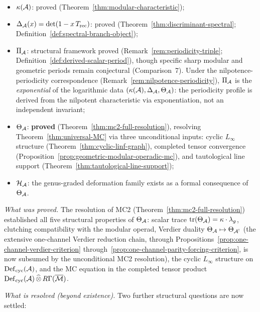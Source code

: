 \begin{itemize}[nosep]
\item $\kappa(\mathcal{A})$: proved (Theorem~\ref{thm:modular-characteristic});
\item $\Delta_{\mathcal{A}}(x) = \det(1 - x\,T_{\mathrm{rec}})$: proved
  (Theorem~\ref{thm:discriminant-spectral};
  Definition~\ref{def:spectral-branch-object});
\item $\Pi_{\mathcal{A}}$: structural framework proved
  (Remark~\ref{rem:periodicity-triple};
  Definition~\ref{def:derived-scalar-period}), though
  specific sharp modular and geometric periods remain conjectural
  (Comparison~7).  Under the nilpotence-periodicity correspondence
  (Remark~\ref{rem:nilpotence-periodicity}), $\Pi_{\mathcal{A}}$ is the
  \emph{exponential} of the logarithmic data
  $(\kappa(\mathcal{A}), \Delta_{\mathcal{A}}, \Theta_{\mathcal{A}})$: the periodicity
  profile is derived from the nilpotent characteristic via
  exponentiation, not an independent invariant;
\item $\Theta_{\mathcal{A}}$: \textbf{proved}
  (Theorem~\ref{thm:mc2-full-resolution}), resolving
  Theorem~\ref{thm:universal-MC} via three unconditional inputs:
  cyclic $L_\infty$ structure
  (Theorem~\ref{thm:cyclic-linf-graph}),
  completed tensor convergence
  (Proposition~\ref{prop:geometric-modular-operadic-mc}),
  and tautological line support
  (Theorem~\ref{thm:tautological-line-support});
\item $\mathcal{H}_{\mathcal{A}}$: the genus-graded deformation family
  exists as a formal consequence of $\Theta_{\mathcal{A}}$.
\end{itemize}

\emph{What was proved.}
The resolution of MC2 (Theorem~\ref{thm:mc2-full-resolution})
established all five structural properties of $\Theta_{\mathcal{A}}$:
scalar trace $\operatorname{tr}(\Theta_{\mathcal{A}}) = \kappa \cdot
\lambda_g$, clutching compatibility with the modular operad,
Verdier duality $\Theta_{\mathcal{A}} \mapsto \Theta_{\mathcal{A}^!}$
(the extensive one-channel Verdier reduction chain, through
Propositions~\ref{prop:one-channel-verdier-criterion}
through~\ref{prop:one-channel-parity-forcing-criterion},
is now subsumed by the unconditional MC2 resolution),
the cyclic $L_\infty$ structure on $\operatorname{Def}_{\mathrm{cyc}}(\mathcal{A})$, and the MC
equation in the completed tensor product
$\operatorname{Def}_{\mathrm{cyc}}(\mathcal{A}) \,\widehat{\otimes}\, R\Gamma(\overline{\mathcal{M}})$.

\emph{What is resolved (beyond existence).}
Two further structural questions are now settled:

